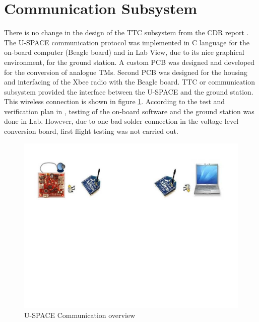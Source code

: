 

\section{Communication Subsystem}
\label{sec:com}
There is no change in the design of the \ac{TTC} subsystem from the CDR report \cite{CDR_TTC}. The \ac{U-SPACE} communication protocol was implemented in C language for the on-board computer (Beagle board) and in Lab View, due to its nice graphical environment, for the ground station. A custom \ac{PCB} was designed and developed for the conversion of analogue \acp{TM}. Second \ac{PCB} was designed for the housing and interfacing of the Xbee radio with the Beagle board. \ac{TTC} or communication subsystem provided the interface between the \ac{U-SPACE} and the ground station. This wireless connection is shown in figure \ref{fig:com_setup}. According to the test and verification plan in \cite{CDR_TTC}, testing of the on-board software and the ground station was done in Lab. However, due to one bad solder connection in the voltage level conversion board, first flight testing was not carried out.
\begin{figure}[bht]
\centering
\includegraphics[scale=0.5]{figures/com_setup.pdf}
\caption[\ac{U-SPACE}Communication overview]{\ac{U-SPACE} Communication overview}
\label{fig:com_setup}
\end{figure}
%

